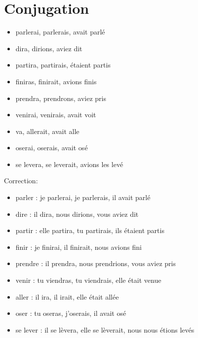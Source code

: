 \documentclass{book}
\begin{document}
    \section{Conjugation}
        \begin{itemize}
            \item parlerai, parlerais, avait parlé
            \item dira, dirions, aviez dit
            \item partira, partirais, étaient partis
            \item finiras, finirait, avions finis 
            \item prendra, prendrons, aviez pris
            \item venirai, venirais, avait voit 
            \item va, allerait, avait alle
            \item oserai, oserais, avait osé
            \item se levera, se leverait, avions les levé
        \end{itemize}
        Correction:
        \begin{itemize}
            \item parler : je parlerai, je parlerais, il avait parlé
            \item dire : il dira, nous dirions, vous aviez dit
            \item partir : elle partira, tu partirais, ils étaient partis
            \item finir : je finirai, il finirait, nous avions fini
            \item prendre : il prendra, nous prendrions, vous aviez pris
            \item venir : tu viendras, tu viendrais, elle était venue
            \item aller : il ira, il irait, elle était allée
            \item oser : tu oseras, j'oserais, il avait osé
            \item se lever : il se lèvera, elle se lèverait, nous nous étions levés
        \end{itemize}
\end{document}
